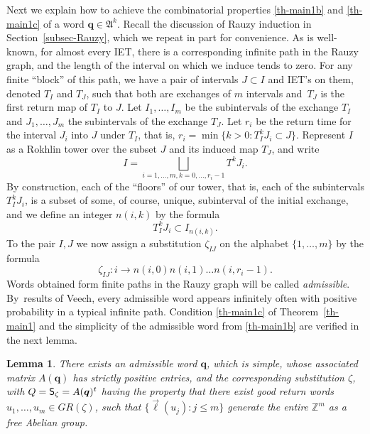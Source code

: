 \documentclass[10pt]{amsart}
\newcommand{\sep}{:}
\theoremstyle{plain}
\newtheorem{lemma}[theorem]{Lemma}
\theoremstyle{definition}
\newcommand \q {{\boldsymbol q}}
\newcommand\bq{{\boldsymbol q}}
\newcommand\FrA{\mathfrak{A}}
\newcommand{\Z}{\mathbb{Z}}
\newcommand\Sf{{\sf S}}
\begin{document}
Next we explain how to achieve the combinatorial properties \eqref{th-main1b} and \eqref{th-main1c} of a word $\bq\in \FrA^k$. Recall the discussion of Rauzy induction in Section~\ref{subsec-Rauzy}, which we repeat in part for convenience.
As is well-known, for almost every IET, there is a corresponding infinite path in the Rauzy graph, and the length of the interval on which we induce tends to zero. For any finite ``block'' of this path, we
have a pair of intervals $J\subset I$ and IET's on them, denoted $T_I$ and $T_J$, such that both are
exchanges of $m$ intervals and~$T_J$ is the first return map of $T_I$ to $J$. Let $I_1, \dots, I_m$ be the subintervals of the exchange $T_I$ and $J_1, \dots, J_m$ the subintervals of the exchange $T_J$.
Let $r_i$ be the return time for the interval $J_i$ into $J$ under $T_I$, that is,
$
r_i=\min\{ k>0: T_I^kJ_i\subset J\}.
$
Represent $I$ as a Rokhlin tower over the subset $J$ and its induced map $T_J$, and write
\[
I=\bigsqcup\limits_{i=1,\dots, m, k=0, \dots, r_i-1} T^{k}J_i.
\]
By construction, each of the ``floors'' of our tower, that is, each of the subintervals $T_I^{k}J_i$, is a subset of some, of course, unique, subinterval of the initial exchange, and we define an integer $n(i,k)$ by the formula
\[
T_I^{k}J_i\subset I_{n(i,k)}.
\]
To the pair $I,J$ we now assign a substitution $\zeta_{IJ}$ on the alphabet
$\{1, \dots, m\}$ by the formula
\begin{equation} \label{zeta-def}
\zeta_{IJ}: i\to n(i,0)n(i,1)\dots n(i, r_i-1).
\end{equation}
Words obtained form finite paths in the Rauzy graph will be called \emph{admissible}. By~\hbox{results} of Veech, every admissible word appears infinitely often with positive probability in a typical infinite path. Condition \eqref{th-main1c} of Theorem~\ref{th-main1} and the simplicity of the admissible word from \eqref{th-main1b} are verified in the next lemma.
\begin{lemma} \label{lem-combi1}
There exists an admissible word $\bq$, which is \emph{simple}, whose associated matrix $A(\q)$ has strictly positive entries, and the corresponding substitution $\zeta$, with $Q = \Sf_\zeta=A(\q)^t$ having the property that there exist \emph{good return words}
$u_1,\ldots,u_m\in GR(\zeta)$, such that $\{\vec{\ell}(u_j)\sep j\le m\}$ generate the entire
$\Z^m$ as a free Abelian group.
\end{lemma}
\end{document}
